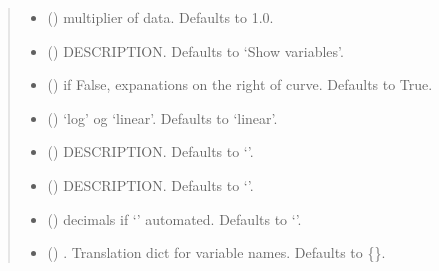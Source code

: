 \documentclass[letterpaper,10pt,english]{sphinxmanual}
\begin{document}
\begin{fulllineitems}
\begin{fulllineitems}
\begin{quote}
\begin{description}
\begin{itemize}
\item {} 
\sphinxAtStartPar
{} (\sphinxstyleliteralemphasis{\sphinxupquote{, }}) \textendash{} multiplier of data. Defaults to 1.0.

\item {} 
\sphinxAtStartPar
{} (\sphinxstyleliteralemphasis{\sphinxupquote{, }}) \textendash{} DESCRIPTION. Defaults to ‘Show variables’.

\item {} 
\sphinxAtStartPar
{} (\sphinxstyleliteralemphasis{\sphinxupquote{, }}) \textendash{} if False, expanations on the right of curve. Defaults to True.

\item {} 
\sphinxAtStartPar
{} (\sphinxstyleliteralemphasis{\sphinxupquote{, }}) \textendash{} ‘log’ og ‘linear’. Defaults to ‘linear’.

\item {} 
\sphinxAtStartPar
{} (\sphinxstyleliteralemphasis{\sphinxupquote{, }}) \textendash{} DESCRIPTION. Defaults to ‘’.

\item {} 
\sphinxAtStartPar
{} (\sphinxstyleliteralemphasis{\sphinxupquote{, }}) \textendash{} DESCRIPTION. Defaults to ‘’.

\item {} 
\sphinxAtStartPar
{} (\sphinxstyleliteralemphasis{\sphinxupquote{, }}) \textendash{} decimals if ‘’ automated. Defaults to ‘’.

\item {} 
\sphinxAtStartPar
{} (\sphinxstyleliteralemphasis{\sphinxupquote{, }}) \textendash{} . Translation dict for variable names. Defaults to \{\}.


\end{itemize}
\end{description}
\end{quote}
\end{fulllineitems}
\end{fulllineitems}
\end{document}

